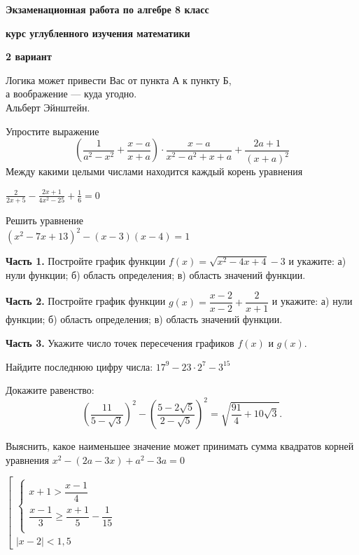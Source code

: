\centerline{\Huge \bf  Экзаменационная работа по алгебре 8 класс}
\centerline{\Huge \bf курс углубленного изучения математики}
\centerline{\Large \bf 2 вариант}

\begin{flushright}
    \scriptsize{Логика может привести Вас от пункта А к пункту Б,\\ а воображение — куда угодно.\\ Альберт Эйнштейн.}
\end{flushright}

Упростите выражение
\[ \left( \dfrac{1}{a^2 - x^2} + \dfrac{x-a}{x+a}\right)\cdot\dfrac{x-a}{x^2 - a^2 + x+a} + \dfrac{2a+1}{(x+a)^2}\]
Между какими целыми числами находится каждый корень уравнения

\noindent
$\frac{2}{2x+5} - \frac{2x+1}{4x^2-25} + \frac{1}{6} = 0$

Решить уравнение\\
$(x^2-7x+13)^2 - (x-3)(x-4) = 1$

\textbf{Часть 1.} Постройте график функции $f(x) = \sqrt{x^2-4x+4}-3$ и укажите: а) нули функции; б) область определения; в) область значений функции. 

\noindent
\textbf{Часть 2.} Постройте график функции $g(x) = \dfrac{x-2}{x-2} + \dfrac{2}{x+1}$ и укажите: а) нули функции; б) область определения; в) область значений функции.

\noindent
\textbf{Часть 3.} Укажите число точек пересечения графиков $f(x)$ и $g(x).$

Найдите последнюю цифру числа: 
$17^9 - 23 \cdot 2^7 - 3^{15}$

Докажите равенство:
\[
\left( \frac{11}{5 - \sqrt{3}} \right)^2 - \left( \frac{5 - 2\sqrt{5}}{2 - \sqrt{5}} \right)^2 = \sqrt{ \frac{91}{4} + 10\sqrt{3} }.
\]

Выяснить, какое наименьшее значение может принимать сумма квадратов корней уравнения $x^2 - (2a-3x) + a^2 - 3a = 0$

$
\left[ 
  \begin{gathered} 
    \left\{ 
      \begin{gathered} 
        x+1>\dfrac{x-1}{4}
        \\  
        \dfrac{x-1}{3}\geq \dfrac{x+1}{5}-\dfrac{1}{15}
        \\
      \end{gathered} 
    \right.  
    \\ 
    |x-2| < 1,5
  \end{gathered}
  \right.
$

